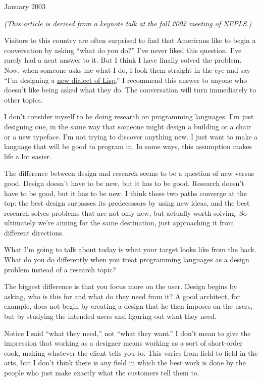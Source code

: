 January 2003

\emph{(This article is derived from a keynote talk at the fall 2002
meeting of NEPLS.)}

Visitors to this country are often surprised to find that Americans like
to begin a conversation by asking ``what do you do?'' I've never liked
this question. I've rarely had a neat answer to it. But I think I have
finally solved the problem. Now, when someone asks me what I do, I look
them straight in the eye and say ``I'm designing a \href{arc.html}{new
dialect of Lisp}.'' I recommend this answer to anyone who doesn't like
being asked what they do. The conversation will turn immediately to
other topics.

I don't consider myself to be doing research on programming languages.
I'm just designing one, in the same way that someone might design a
building or a chair or a new typeface. I'm not trying to discover
anything new. I just want to make a language that will be good to
program in. In some ways, this assumption makes life a lot easier.

The difference between design and research seems to be a question of new
versus good. Design doesn't have to be new, but it has to be good.
Research doesn't have to be good, but it has to be new. I think these
two paths converge at the top: the best design surpasses its
predecessors by using new ideas, and the best research solves problems
that are not only new, but actually worth solving. So ultimately we're
aiming for the same destination, just approaching it from different
directions.

What I'm going to talk about today is what your target looks like from
the back. What do you do differently when you treat programming
languages as a design problem instead of a research topic?

The biggest difference is that you focus more on the user. Design begins
by asking, who is this for and what do they need from it? A good
architect, for example, does not begin by creating a design that he then
imposes on the users, but by studying the intended users and figuring
out what they need.

Notice I said ``what they need,'' not ``what they want.'' I don't mean
to give the impression that working as a designer means working as a
sort of short-order cook, making whatever the client tells you to. This
varies from field to field in the arts, but I don't think there is any
field in which the best work is done by the people who just make exactly
what the customers tell them to.

